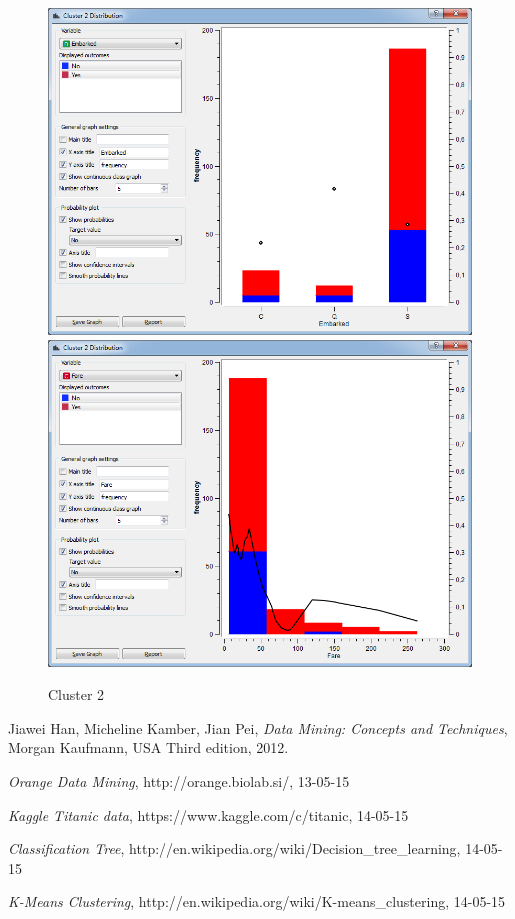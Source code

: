 \documentclass[a4paper,11pt]{article}
\begin{document}
\begin{figure}[h]
\begin{center}
		\includegraphics[scale=0.30]{ClusterDistribution/Cluster2/Embarked}
		\includegraphics[scale=0.30]{ClusterDistribution/Cluster2/Fare}
	\end{center}
	\caption{Cluster 2}
	\label{ClusterTwo}
\end{figure}

\begin{thebibliography}{9}

	Jiawei Han, 
	Micheline Kamber, 
	Jian Pei,
	\emph{Data Mining: Concepts and Techniques},
	Morgan Kaufmann, USA	
	Third edition,
	2012.
	

  \emph{Orange Data Mining},
  http://orange.biolab.si/,
  13-05-15
  
	\emph{Kaggle Titanic data},
	https://www.kaggle.com/c/titanic,
	14-05-15
	

	\emph{Classification Tree},
	http://en.wikipedia.org/wiki/Decision\_tree\_learning,
	14-05-15
	
	\emph{K-Means Clustering},
	http://en.wikipedia.org/wiki/K-means\_clustering,
	14-05-15

	
	
\end{thebibliography}
\end{document}
